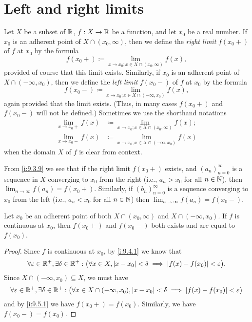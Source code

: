 \section{Left and right limits}\label{i:sec:9.5}

\begin{defn}\label{i:9.5.1}
  Let \(X\) be a subset of \(\mathbb{R}\), \(f : X \to \mathbb{R}\) be a function, and let \(x_0\) be a real number.
  If \(x_0\) is an adherent point of \(X \cap (x_0, \infty)\), then we define the \emph{right limit} \(f(x_0+)\) of \(f\) at \(x_0\) by the formula
  \[
    f(x_0+) \coloneqq \lim_{x \to x_0 ; x \in X \cap (x_0, \infty)} f(x),
  \]
  provided of course that this limit exists.
  Similarly, if \(x_0\) is an adherent point of \(X \cap (-\infty, x_0)\), then we define the \emph{left limit} \(f(x_0-)\) of \(f\) at \(x_0\) by the formula
  \[
    f(x_0-) \coloneqq \lim_{x \to x_0 ; x \in X \cap (-\infty, x_0)} f(x),
  \]
  again provided that the limit exists.
  (Thus, in many cases \(f(x_0+)\) and \(f(x_0-)\) will not be defined.)
  Sometimes we use the shorthand notations
  \begin{align*}
    \lim_{x \to x_0+} f(x) & \coloneqq \lim_{x \to x_0 ; x \in X \cap (x_0, \infty)} f(x); \\
    \lim_{x \to x_0-} f(x) & \coloneqq \lim_{x \to x_0 ; x \in X \cap (-\infty, x_0)} f(x)
  \end{align*}
  when the domain \(X\) of \(f\) is clear from context.
\end{defn}

\begin{note}
  From \cref{i:9.3.9} we see that if the right limit \(f(x_0+)\) exists, and \((a_n)_{n = 0}^\infty\) is a sequence in \(X\) converging to \(x_0\) from the right (i.e., \(a_n > x_0\) for all \(n \in \mathbb{N}\)), then \(\lim_{n \to \infty} f(a_n) = f(x_0+)\).
  Similarly, if \((b_n)_{n = 0}^\infty\) is a sequence converging to \(x_0\) from the left (i.e., \(a_n < x_0\) for all \(n \in \mathbb{N}\)) then \(\lim_{n \to \infty} f(a_n) = f(x_0-)\).
\end{note}

\begin{ac}\label{i:ac:9.5.1}
  Let \(x_0\) be an adherent point of both \(X \cap (x_0, \infty)\) and \(X \cap (-\infty, x_0)\).
  If \(f\) is continuous at \(x_0\), then \(f(x_0+)\) and \(f(x_0-)\) both exists and are equal to \(f(x_0)\).
\end{ac}

\begin{proof}
  Since \(f\) is continuous at \(x_0\), by \cref{i:9.4.1} we know that
  \[
    \forall \varepsilon \in \mathbb{R}^+, \exists \delta \in \mathbb{R}^+ : \big(\forall x \in X, \left\lvert x - x_0\right\rvert < \delta \implies \left\lvert f(x) - f(x_0)\right\rvert < \varepsilon\big).
  \]
  Since \(X \cap (-\infty, x_0) \subseteq X\), we must have
  \[
    \forall \varepsilon \in \mathbb{R}^+, \exists \delta \in \mathbb{R}^+ : \big(\forall x \in X \cap (-\infty, x_0), \left\lvert x - x_0\right\rvert < \delta \implies \left\lvert f(x) - f(x_0)\right\rvert < \varepsilon\big)
  \]
  and by \cref{i:9.5.1} we have \(f(x_0+) = f(x_0)\).
  Similarly, we have \(f(x_0-) = f(x_0)\).
\end{proof}

